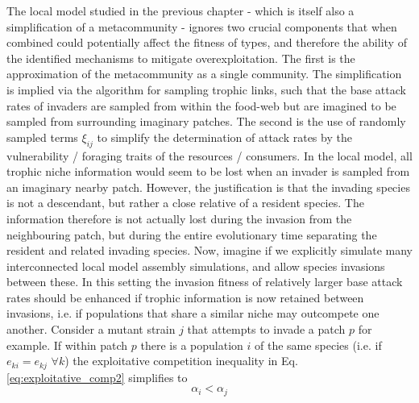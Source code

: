 \documentclass[a4paper]{report}
\begin{document}
{ The local model studied in the previous chapter - which is itself also a simplification of a metacommunity - ignores two crucial components that when combined could potentially affect the fitness of types, and therefore the ability of the identified mechanisms to mitigate overexploitation. The first is the approximation of the metacommunity as a single community. The simplification is implied via the algorithm for sampling trophic links, such that the base attack rates of invaders are sampled from within the food-web but are imagined to be sampled from surrounding imaginary patches. The second is the use of randomly sampled terms $\xi_{ij}$ to simplify the determination of attack rates by the vulnerability / foraging traits of the resources / consumers. In the local model, all trophic niche information would seem to be lost  when an invader is sampled from an imaginary nearby patch. However, the justification is that the invading species is not a descendant, but rather a close relative of a resident species. The information therefore is not actually lost during the invasion from the neighbouring patch, but during the entire evolutionary time separating the resident and related invading species. Now, imagine if we explicitly simulate many interconnected local model assembly simulations, and allow species invasions between these. In this setting the invasion fitness of relatively larger base attack rates should be enhanced if trophic information is now retained between invasions, i.e. if populations that share a similar niche may outcompete one another. Consider a mutant strain $j$ that attempts to invade a patch $p$ for example. If within patch $p$ there is a population $i$ of the same species (i.e. if $e_{ki}=e_{kj}$ $\forall k$) the exploitative competition inequality in Eq. \eqref{eq:exploitative_comp2} simplifies to
\begin{equation}
\alpha_i<\alpha_j \label{eq:exploi_2}
\end{equation}

}
\end{document}
